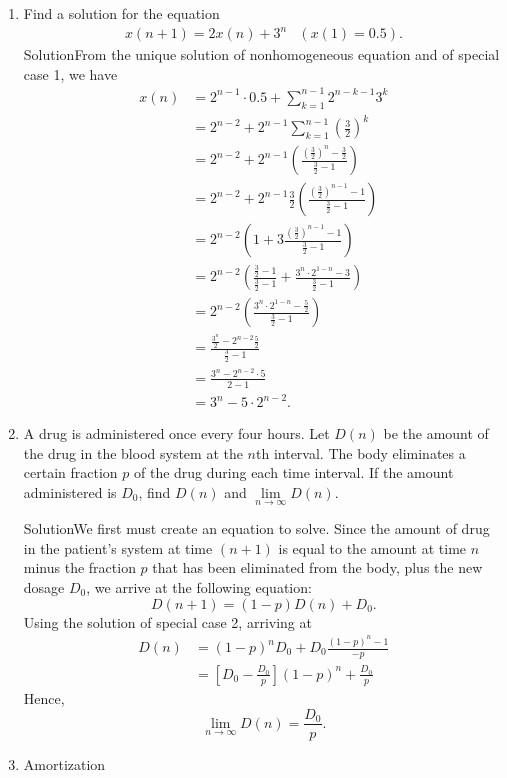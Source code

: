 \begin{enumerate}
    \item Find a solution for the equation
        \begin{align*}
            x(n+1)=2x(n)+3^n & \left(x(1)=0.5\right).
        \end{align*}
        Solution\quad From the unique solution of nonhomogeneous equation and of special case 1, we have
        \begin{align*}
            x(n) & =2^{n-1}\cdot0.5+\sum_{k=1}^{n-1}2^{n-k-1}3^k \\
                 & =2^{n-2}+2^{n-1}\sum_{k=1}^{n-1}(\frac{3}{2})^k \\
                 & =2^{n-2}+2^{n-1}\left(\frac{(\frac{3}{2})^n-\frac{3}{2}}{\frac{3}{2}-1}\right) \\
                 & =2^{n-2}+2^{n-1}\frac{3}{2}\left(\frac{(\frac{3}{2})^{n-1}-1}{\frac{3}{2}-1}\right) \\
                 & =2^{n-2}\left(1+3\frac{(\frac{3}{2})^{n-1}-1}{\frac{3}{2}-1}\right) \\
                 & =2^{n-2}\left(\frac{\frac{3}{2}-1}{\frac{3}{2}-1}+\frac{3^n\cdot 2^{1-n}-3}{\frac{3}{2}-1}\right) \\
                 & =2^{n-2}\left(\frac{3^n\cdot 2^{1-n}-\frac{5}{2}}{\frac{3}{2}-1}\right) \\
                 & =\frac{\frac{3^n}{2}-2^{n-2}\frac{5}{2}}{\frac{3}{2}-1} \\
                 & =\frac{3^n-2^{n-2}\cdot 5}{2-1} \\
                 & = 3^n-5\cdot 2^{n-2}.
        \end{align*}
    \item A drug is administered once every four hours. Let $D(n)$ be the amount of the drug in the blood system at the $n$th interval. The body eliminates a certain fraction $p$ of the drug during each time interval. If the amount administered is $D_0$, find $D(n)$ and $\lim\limits_{n\to\infty} D(n)$.

        Solution\quad We first must create an equation to solve. Since the amount of drug in the patient's system at time $(n+1)$ is equal to the amount at time $n$ minus the fraction $p$ that has been eliminated from the body, plus the new dosage $D_0$, we arrive at the following equation:
        \[D(n+1)=(1-p)D(n)+D_0.\]
        Using the solution of special case 2, arriving at
        \begin{align*}
            D(n) & =(1-p)^nD_0+D_0\frac{(1-p)^n-1}{-p} \\
                 & =\left[D_0-\frac{D_0}{p}\right](1-p)^n+\frac{D_0}{p}
        \end{align*}
        Hence,
        \[\lim\limits_{n\to\infty} D(n)=\frac{D_0}{p}.\]
    \item Amortization


\end{enumerate}

